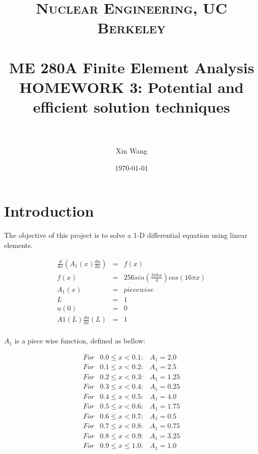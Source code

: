 \documentclass[paper=a4, fontsize=11pt]{article} %
\title{	
\normalfont \normalsize 
\textsc{Nuclear Engineering, UC Berkeley} \\ [25pt] %
\horrule{0.5pt} \\[0.4cm] %
\huge ME 280A Finite Element Analysis \\HOMEWORK 3: Potential and efficient solution techniques  \\  %
\horrule{2pt} \\[0.5cm] %
}
\author{Xin Wang} %
\date{\normalsize\today} %
\begin{document}
\maketitle %

\newpage

\section{Introduction}

The objective of this project is to solve a 1-D differential equation using linear elements.  

\begin{eqnarray}
\frac{d}{dx}(A_1(x) \frac{du}{dx}) &=& f(x)\nonumber\\
f(x)&=&256sin(\frac{3\pi kx}{4})cos(16 \pi x) \nonumber\\
A_1(x)& = & piecewise\nonumber\\
L&=&1 \nonumber\\
u(0)& =& 0 \nonumber\\
A1(L)\frac{du}{dx}(L) &=& 1 \nonumber\\
\end{eqnarray}

$A_1$ is a piece wise function, defined as bellow:

\begin{eqnarray}
For & 0.0 \leq x < 0.1 :& A_1 = 2.0 \nonumber\\
For & 0.1 \leq x < 0.2 :& A_1 = 2.5 \nonumber\\
For & 0.2 \leq x < 0.3 :& A_1 = 1.25 \nonumber\\
For & 0.3 \leq x < 0.4 :& A_1 = 0.25 \nonumber\\
For & 0.4 \leq x < 0.5 :& A_1 = 4.0 \nonumber\\
For & 0.5 \leq x < 0.6 :& A_1 = 1.75 \nonumber\\
For & 0.6 \leq x < 0.7 :& A_1 = 0.5 \nonumber\\
For & 0.7 \leq x < 0.8 :& A_1 = 0.75 \nonumber\\
For & 0.8 \leq x < 0.9 :& A_1 = 3.25\nonumber\\
For & 0.9 \leq x \leq 1.0 :& A_1 = 1.0
\end{eqnarray}

\end{document}
